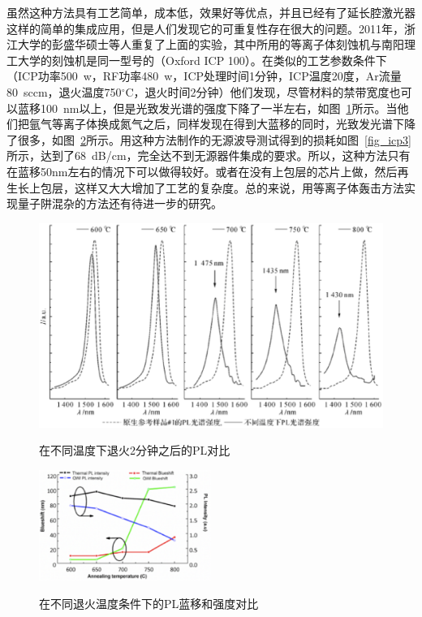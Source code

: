 \documentclass{ZJUthesis}
\begin{document}
虽然这种方法具有工艺简单，成本低，效果好等优点，并且已经有了延长腔激光器这样的简单的集成应用，但是人们发现它的可重复性存在很大的问题。2011年，浙江大学的彭盛华硕士等人重复了上面的实验\cite{彭盛华2011氩等离子体诱导量子阱混合技术}，其中所用的等离子体刻蚀机与南阳理工大学的刻蚀机是同一型号的（Oxford ICP 100）。在类似的工艺参数条件下（ICP功率500~w，RF功率480~w，ICP处理时间1分钟，ICP温度20度，Ar流量80~sccm，退火温度750$^{\circ}$C，退火时间2分钟）他们发现，尽管材料的禁带宽度也可以蓝移100~nm以上，但是光致发光谱的强度下降了一半左右，如图~\ref{fig_icp}所示。当他们把氩气等离子体换成氮气之后，同样发现在得到大蓝移的同时，光致发光谱下降了很多\cite{Peng2009Nitrogen}，如图~\ref{fig_icp2}所示。用这种方法制作的无源波导测试得到的损耗如图~\ref{fig_icp3}所示，达到了68~dB/cm\cite{Zhang2010Optical}，完全达不到无源器件集成的要求。所以，这种方法只有在蓝移50nm左右的情况下可以做得较好。或者在没有上包层的芯片上做，然后再生长上包层，这样又大大增加了工艺的复杂度。总的来说，用等离子体轰击方法实现量子阱混杂的方法还有待进一步的研究。

\begin{figure}[htbp]
  \centering
  \includegraphics[width=1.0\textwidth]{./Pictures/icp.eps}\\
  \caption{在不同温度下退火2分钟之后的PL对比}
  \label{fig_icp}
\end{figure}

\begin{figure}[htbp]
  \centering
  \includegraphics[width=0.5\textwidth]{./Pictures/icp2.eps}\\
  \caption{在不同退火温度条件下的PL蓝移和强度对比}
  \label{fig_icp2}
\end{figure}
\end{document}

